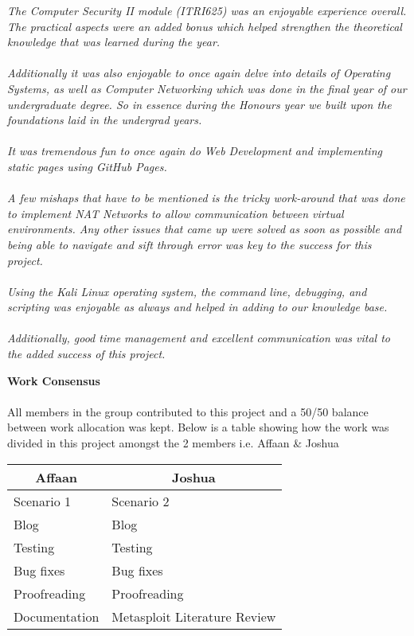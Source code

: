 \documentclass[a4paper, 12pt, titlepage]{report}
\begin{document}
\begin{displayquote}
\textit{The Computer Security II module (ITRI625) was an enjoyable experience overall. The practical aspects were an added bonus which helped strengthen the theoretical knowledge that was learned during the year.
\\\\
Additionally it was also enjoyable to once again delve into details of Operating Systems, as well as Computer Networking which was done in the final year of our undergraduate degree. So in essence during the Honours year we built upon the foundations laid in the undergrad years.
\\\\
It was tremendous fun to once again do Web Development and implementing static pages using GitHub Pages.
\\\\
A few mishaps that have to be mentioned is the tricky work-around that was done to implement NAT Networks to allow communication between virtual environments. Any other issues that came up were solved as soon as possible and being able to navigate and sift through error was key to the success for this project.
\\\\
Using the Kali Linux operating system, the command line, debugging, and scripting was enjoyable as always and helped in adding to our knowledge base.
\\\\
Additionally, good time management and excellent communication was vital to the added success of this project.}
\end{displayquote}
\textbf{Work Consensus}\\\\
All members in the group contributed to this project and a 50/50 balance between work allocation was kept. Below is a table showing how the work was divided in this project amongst the 2 members i.e. Affaan \& Joshua
\begin{table}[H]
\centering
\begin{tabular}{@{}ll@{}}
\toprule
\multicolumn{1}{c}{Affaan}   & \multicolumn{1}{c}{Joshua}         \\ \midrule
Scenario 1     & Scenario 2             \\
Blog & Blog            \\
Testing                      & Testing                            \\
Bug fixes                    & Bug fixes                          \\
Proofreading                        & Proofreading                              \\
Documentation                & Metasploit Literature Review \\ \bottomrule
\end{tabular}
\end{table}
\end{document}
